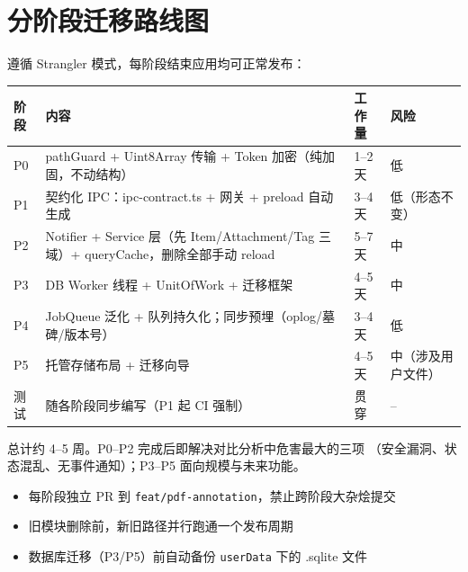 \documentclass[12pt, a4paper]{article}
\begin{document}
\section{分阶段迁移路线图}

遵循 Strangler 模式，每阶段结束应用均可正常发布：

\begin{center}
\begin{tabular}{p{1.4cm} p{5.6cm} p{2.4cm} p{2.6cm}}
  \toprule
  \textbf{阶段} & \textbf{内容} & \textbf{工作量} & \textbf{风险} \\
  \midrule
  P0 & pathGuard + Uint8Array 传输 + Token 加密（纯加固，不动结构） & 1--2 天 & 低 \\
  P1 & 契约化 IPC：ipc-contract.ts + 网关 + preload 自动生成 & 3--4 天 & 低（形态不变） \\
  P2 & Notifier + Service 层（先 Item/Attachment/Tag 三域）+ queryCache，删除全部手动 reload & 5--7 天 & 中 \\
  P3 & DB Worker 线程 + UnitOfWork + 迁移框架 & 4--5 天 & 中 \\
  P4 & JobQueue 泛化 + 队列持久化；同步预埋（oplog/墓碑/版本号） & 3--4 天 & 低 \\
  P5 & 托管存储布局 + 迁移向导 & 4--5 天 & 中（涉及用户文件） \\
  测试 & 随各阶段同步编写（P1 起 CI 强制） & 贯穿 & -- \\
  \bottomrule
\end{tabular}
\end{center}

总计约 4--5 周。P0--P2 完成后即解决对比分析中危害最大的三项
（安全漏洞、状态混乱、无事件通知）；P3--P5 面向规模与未来功能。

\begin{tcolorbox}[notebox, title={迁移纪律}]
  \begin{itemize}[leftmargin=1em, itemsep=1pt]
    \item 每阶段独立 PR 到 \texttt{feat/pdf-annotation}，禁止跨阶段大杂烩提交
    \item 旧模块删除前，新旧路径并行跑通一个发布周期
    \item 数据库迁移（P3/P5）前自动备份 \texttt{userData} 下的 .sqlite 文件
  \end{itemize}
\end{tcolorbox}

\end{document}
